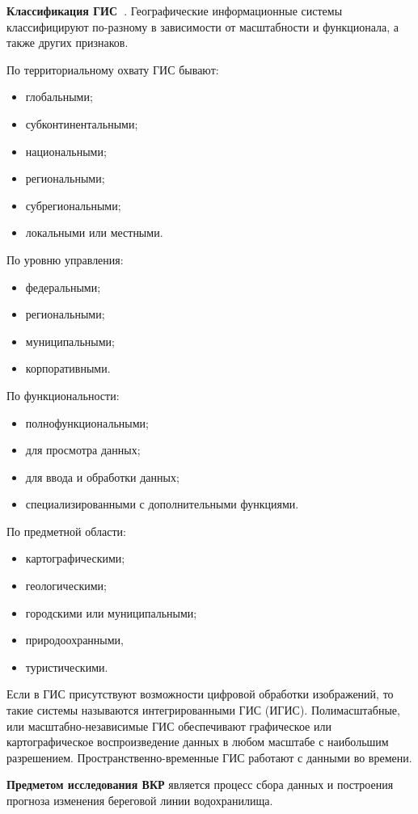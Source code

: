 \documentclass[732,fontsize=14pt,final]{studrep}
\begin{document}
\textbf{Классификация ГИС~\cite{gisclass}}.
Географические информационные системы классифицируют по-разному в зависимости от масштабности и функционала, а также других признаков.

По территориальному охвату ГИС бывают:
\begin{itemize}
\item глобальными;
\item субконтинентальными;
\item национальными;
\item региональными;
\item субрегиональными;
\item локальными или местными.
\end{itemize}

По уровню управления:
\begin{itemize}
\item федеральными;
\item региональными;
\item муниципальными;
\item корпоративными.
\end{itemize}

По функциональности:
\begin{itemize}
\item полнофункциональными;
\item для просмотра данных;
\item для ввода и обработки данных;
\item специализированными с дополнительными функциями.
\end{itemize}

По предметной области:
\begin{itemize}
\item картографическими;
\item геологическими;
\item городскими или муниципальными;
\item природоохранными,
\item туристическими.
\end{itemize}

Если в ГИС присутствуют возможности цифровой обработки изображений, то такие системы называются интегрированными ГИС (ИГИС). Полимасштабные, или масштабно-независимые ГИС обеспечивают графическое или картографическое воспроизведение данных в любом масштабе с наибольшим разрешением. Пространственно-временные ГИС работают с данными во времени.

\textbf{Предметом исследования ВКР} является процесс сбора данных и построения прогноза изменения береговой линии водохранилища.
\end{document}
